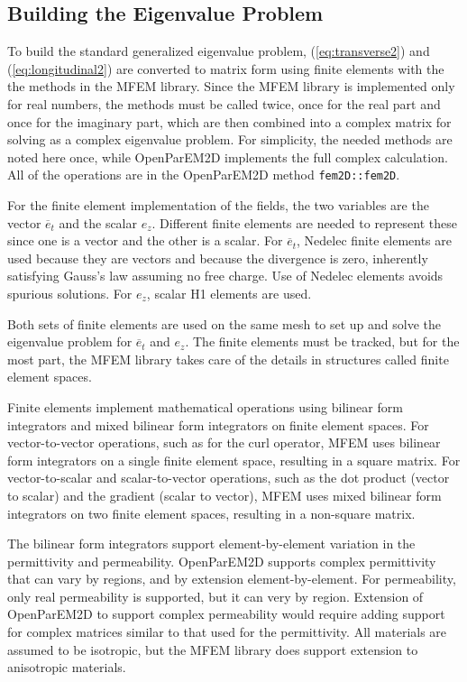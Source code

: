 \documentclass[titlepage]{article}
\renewcommand\_{\textunderscore\linebreak[1]}
\begin{document}
\subsection{Building the Eigenvalue Problem}

To build the standard generalized eigenvalue problem, (\ref{eq:transverse2}) and (\ref{eq:longitudinal2}) are converted to matrix form using finite elements with the the methods in the MFEM library.  Since the MFEM library is implemented only for real numbers, the methods must be called twice, once for the real part and once for the imaginary part, which are then combined into a complex matrix for solving as a complex eigenvalue problem.  For simplicity, the needed methods are noted here once, while OpenParEM2D implements the full complex calculation.  All of the operations are in the OpenParEM2D method \texttt{fem2D::fem2D}.

For the finite element implementation of the fields, the two variables are the vector $\overline{e}_t$ and the scalar $e_z$.  Different finite elements are needed to represent these since one is a vector and the other is a scalar.  For $\overline{e}_t$, Nedelec finite elements are used because they are vectors and because the divergence is zero, inherently satisfying Gauss's law assuming no free charge.  Use of Nedelec elements avoids spurious solutions.  For $e_z$, scalar H1 elements are used.

Both sets of finite elements are used on the same mesh to set up and solve the eigenvalue problem for $\overline{e}_t$ and $e_z$. The finite elements must be tracked, but for the most part, the MFEM library takes care of the details in structures called finite element spaces.

Finite elements implement mathematical operations using bilinear form integrators and mixed bilinear form integrators on finite element spaces.  For vector-to-vector operations, such as for the curl operator, MFEM uses bilinear form integrators on a single finite element space, resulting in a square matrix.
For vector-to-scalar and scalar-to-vector operations, such as the dot product (vector to scalar) and the gradient (scalar to vector), MFEM uses mixed bilinear form integrators on two finite element spaces, resulting in a non-square matrix.

The bilinear form integrators support element-by-element variation in the permittivity and permeability.  OpenParEM2D supports complex permittivity that can vary by regions, and by extension element-by-element.  For permeability, only real permeability is supported, but it can very by region.  Extension of OpenParEM2D to support complex permeability would require adding support for complex matrices similar to that used for the permittivity.  All materials are assumed to be isotropic, but the MFEM library does support extension to anisotropic materials.
\end{document}

